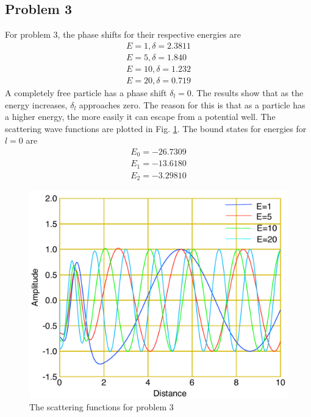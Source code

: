 \documentclass[12pt]{article}
\begin{document}
\subsection{Problem 3}
For problem 3, the phase shifts for their respective energies are
\begin{align*}
E = 1,\delta=2.3811  \\ 
E= 5 ,\delta=1.840 \\
E= 10,\delta=1.232 \\ 
E =20,\delta=0.719 
\end{align*}
A completely free particle has a phase shift $\delta_l=0$. The results show that as the energy increases, $\delta_l$ approaches zero. The reason for this is that as a particle has a higher energy, the more easily it can escape from a potential well. The scattering wave functions are plotted in Fig. \ref {image3one}. The bound states for energies for $l=0$ are
\begin{align*}
E_0 = -26.7309  \\ 
E_1 = -13.6180   \\
E_2 = -3.29810
\end{align*}
\begin {figure}[!htb]
	\includegraphics[width=1.\textwidth]{question_3/plot1.pdf}
	\caption{The scattering functions for problem 3 }
	\label{image3one}
\end {figure}
\end{document}
